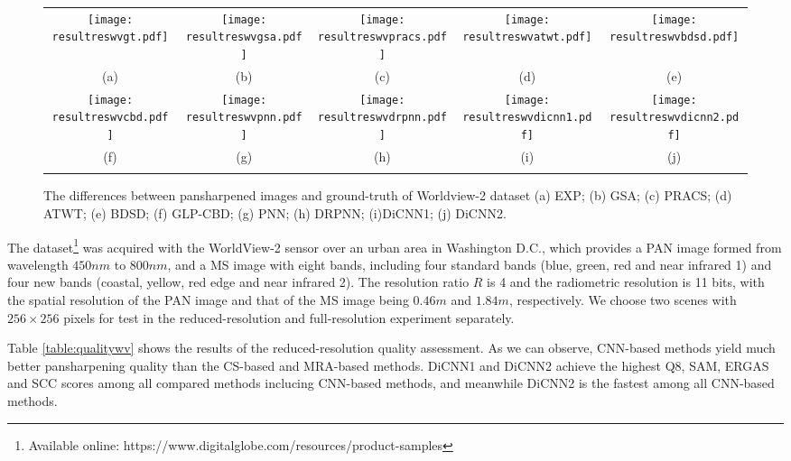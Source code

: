 \documentclass[journal]{IEEEtran}
\begin{document}
\begin{figure*}[t]\scriptsize
\centering
\begin{tabular}{ccccc}
\texttt{[image: resultreswvgt.pdf]} &
\texttt{[image: resultreswvgsa.pdf]} &
\texttt{[image: resultreswvpracs.pdf]} &
\texttt{[image: resultreswvatwt.pdf]} &
\texttt{[image: resultreswvbdsd.pdf]} \\
(a) & (b) & (c) &(d) &(e)  \\
\texttt{[image: resultreswvcbd.pdf]} &
\texttt{[image: resultreswvpnn.pdf]} &
\texttt{[image: resultreswvdrpnn.pdf]} &
\texttt{[image: resultreswvdicnn1.pdf]} &
\texttt{[image: resultreswvdicnn2.pdf]} \\
(f) & (g) &(h) &(i) &(j) \\
\\
\end{tabular}
\caption{The differences between pansharpened images and ground-truth of Worldview-2 dataset (a) EXP; (b) GSA; (c) PRACS; (d) ATWT; (e) BDSD; (f) GLP-CBD; (g) PNN; (h) DRPNN; (i)DiCNN1; (j) DiCNN2.}
\label{figure:resimage:wv}
\end{figure*}

The dataset\footnote{Available online: https://www.digitalglobe.com/resources/product-samples} was acquired with the WorldView-2 sensor over an urban area in Washington D.C., which provides a PAN image formed from wavelength $450nm$ to $800nm$, and a MS image with eight bands, including four standard bands (blue, green, red and near infrared 1) and four new bands (coastal, yellow, red edge and near infrared 2). The resolution ratio $R$ is 4 and the radiometric resolution is 11 bits, with the spatial resolution of the PAN image and that of the MS image being $0.46m$ and $1.84m$, respectively. We choose two scenes with $256\times256$ pixels for test in the reduced-resolution and full-resolution experiment separately.

Table \ref{table:qualitywv} shows the results of the reduced-resolution quality assessment. As we can observe, CNN-based methods yield much better pansharpening quality than the CS-based and MRA-based methods. DiCNN1 and DiCNN2 achieve the highest Q8, SAM, ERGAS and SCC scores among all compared methods inclucing CNN-based methods, and meanwhile DiCNN2 is the fastest among all CNN-based methods.
\end{document}

